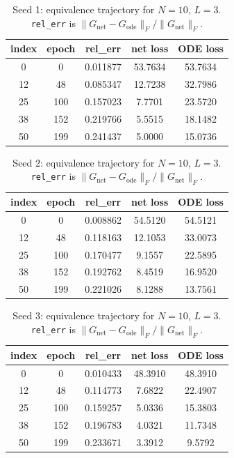 \begin{table}[H]
\centering
\caption{Seed 1: equivalence trajectory for $N=10$, $L=3$. \texttt{rel\_err} is $\|G_{\mathrm{net}} - G_{\mathrm{ode}}\|_F / \|G_{\mathrm{net}}\|_F$.}
\label{tab:equiv-N10-L3-s1}
\begin{tabular}{c c c c c}
\toprule
index & epoch & rel\_err & net loss & ODE loss \\
\midrule
0 & 0 & 0.011877 & 53.7634 & 53.7634 \\
12 & 48 & 0.085347 & 12.7238 & 32.7986 \\
25 & 100 & 0.157023 & 7.7701 & 23.5720 \\
38 & 152 & 0.219766 & 5.5515 & 18.1482 \\
50 & 199 & 0.241437 & 5.0000 & 15.0736 \\
\bottomrule
\end{tabular}
\end{table}

\begin{table}[H]
\centering
\caption{Seed 2: equivalence trajectory for $N=10$, $L=3$. \texttt{rel\_err} is $\|G_{\mathrm{net}} - G_{\mathrm{ode}}\|_F / \|G_{\mathrm{net}}\|_F$.}
\label{tab:equiv-N10-L3-s2}
\begin{tabular}{c c c c c}
\toprule
index & epoch & rel\_err & net loss & ODE loss \\
\midrule
0 & 0 & 0.008862 & 54.5120 & 54.5121 \\
12 & 48 & 0.118163 & 12.1053 & 33.0073 \\
25 & 100 & 0.170477 & 9.1557 & 22.5895 \\
38 & 152 & 0.192762 & 8.4519 & 16.9520 \\
50 & 199 & 0.221026 & 8.1288 & 13.7561 \\
\bottomrule
\end{tabular}
\end{table}

\begin{table}[H]
\centering
\caption{Seed 3: equivalence trajectory for $N=10$, $L=3$. \texttt{rel\_err} is $\|G_{\mathrm{net}} - G_{\mathrm{ode}}\|_F / \|G_{\mathrm{net}}\|_F$.}
\label{tab:equiv-N10-L3-s3}
\begin{tabular}{c c c c c}
\toprule
index & epoch & rel\_err & net loss & ODE loss \\
\midrule
0 & 0 & 0.010433 & 48.3910 & 48.3910 \\
12 & 48 & 0.114773 & 7.6822 & 22.4907 \\
25 & 100 & 0.159257 & 5.0336 & 15.3803 \\
38 & 152 & 0.196783 & 4.0321 & 11.7348 \\
50 & 199 & 0.233671 & 3.3912 & 9.5792 \\
\bottomrule
\end{tabular}
\end{table}

